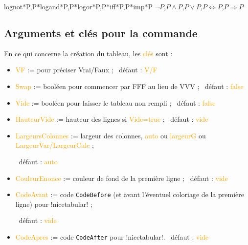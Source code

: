 \documentclass[french,a4paper,11pt]{article}
\newcommand\Cle[1]{{\small\sffamily\textlangle \textcolor{orange}{#1}\textrangle}}
\begin{document}
{{\begin{DemoCode}[]
%
	{lognot*P,P*logand*P,P*logor*P,P*iff*P,P*imp*P}%
	{$\lnot P$,$P \land P$,$P \lor P$,$P \Leftrightarrow P$,$P \Rightarrow P$}
\end{DemoCode}

\begin{DemoCode}[]
\end{DemoCode}

\subsection{Arguments et clés pour la commande}

\begin{DemoCode}
\end{DemoCode}

\begin{tipblock}
En ce qui concerne la création du tableau, les \Cle{clés} sont :

\begin{itemize}
	\item \Cle{VF} := pour préciser Vrai/Faux ; \hfill~défaut : \Cle{V/F}
	\item \Cle{Swap} := booléen pour commencer par FFF au lieu de VVV ; \hfill~défaut : \Cle{false}
	\item \Cle{Vide} := booléen pour laisser le tableau non rempli ; \hfill~défaut : \Cle{false}
	\item \Cle{HauteurVide} := hauteur des lignes si \Cle{Vide=true} ; \hfill~défaut : \Cle{vide}
	\item \Cle{LargeursColonnes} := largeur des colonnes, \Cle{auto} ou \Cle{largeurG} ou \Cle{LargeurVar/LargeurCalc} ;

	\hfill~défaut : \Cle{auto}
	\item \Cle{CouleurEnonce} := couleur de fond de la première ligne ; \hfill~défaut : \Cle{vide}
	\item \Cle{CodeAvant} := code \texttt{CodeBefore} (et avant l'éventuel coloriage de la première ligne) pour \motcletex!nicetabular! ;

	\hfill~défaut : \Cle{vide}
	\item \Cle{CodeApres} := code \texttt{CodeAfter} pour \motcletex!nicetabular!. \hfill~défaut : \Cle{vide}
\end{itemize}


\end{tipblock}}}
\end{document}

